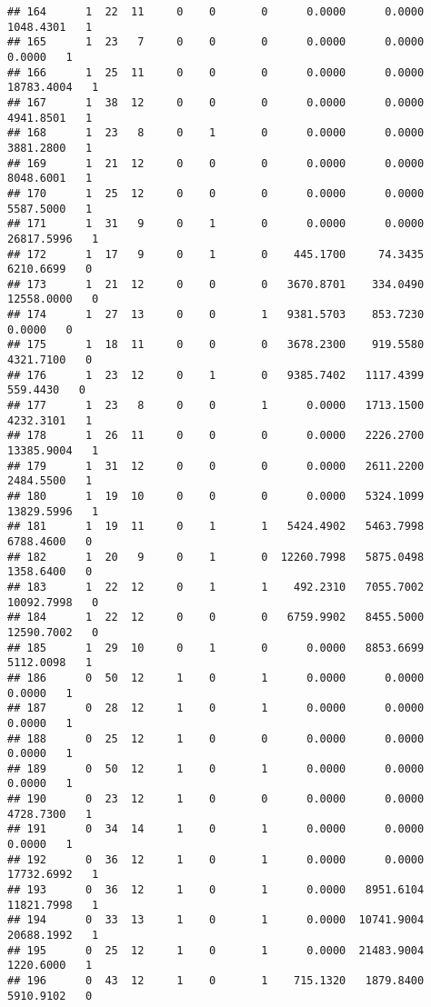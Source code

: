 \documentclass[
]{article}
\begin{document}
\begin{enumerate}
\begin{verbatim}
## 164      1  22  11     0    0       0      0.0000      0.0000   1048.4301   1
## 165      1  23   7     0    0       0      0.0000      0.0000      0.0000   1
## 166      1  25  11     0    0       0      0.0000      0.0000  18783.4004   1
## 167      1  38  12     0    0       0      0.0000      0.0000   4941.8501   1
## 168      1  23   8     0    1       0      0.0000      0.0000   3881.2800   1
## 169      1  21  12     0    0       0      0.0000      0.0000   8048.6001   1
## 170      1  25  12     0    0       0      0.0000      0.0000   5587.5000   1
## 171      1  31   9     0    1       0      0.0000      0.0000  26817.5996   1
## 172      1  17   9     0    1       0    445.1700     74.3435   6210.6699   0
## 173      1  21  12     0    0       0   3670.8701    334.0490  12558.0000   0
## 174      1  27  13     0    0       1   9381.5703    853.7230      0.0000   0
## 175      1  18  11     0    0       0   3678.2300    919.5580   4321.7100   0
## 176      1  23  12     0    1       0   9385.7402   1117.4399    559.4430   0
## 177      1  23   8     0    0       1      0.0000   1713.1500   4232.3101   1
## 178      1  26  11     0    0       0      0.0000   2226.2700  13385.9004   1
## 179      1  31  12     0    0       0      0.0000   2611.2200   2484.5500   1
## 180      1  19  10     0    0       0      0.0000   5324.1099  13829.5996   1
## 181      1  19  11     0    1       1   5424.4902   5463.7998   6788.4600   0
## 182      1  20   9     0    1       0  12260.7998   5875.0498   1358.6400   0
## 183      1  22  12     0    1       1    492.2310   7055.7002  10092.7998   0
## 184      1  22  12     0    0       0   6759.9902   8455.5000  12590.7002   0
## 185      1  29  10     0    1       0      0.0000   8853.6699   5112.0098   1
## 186      0  50  12     1    0       1      0.0000      0.0000      0.0000   1
## 187      0  28  12     1    0       1      0.0000      0.0000      0.0000   1
## 188      0  25  12     1    0       0      0.0000      0.0000      0.0000   1
## 189      0  50  12     1    0       1      0.0000      0.0000      0.0000   1
## 190      0  23  12     1    0       0      0.0000      0.0000   4728.7300   1
## 191      0  34  14     1    0       1      0.0000      0.0000      0.0000   1
## 192      0  36  12     1    0       1      0.0000      0.0000  17732.6992   1
## 193      0  36  12     1    0       1      0.0000   8951.6104  11821.7998   1
## 194      0  33  13     1    0       1      0.0000  10741.9004  20688.1992   1
## 195      0  25  12     1    0       1      0.0000  21483.9004   1220.6000   1
## 196      0  43  12     1    0       1    715.1320   1879.8400   5910.9102   0

\end{verbatim}
\end{enumerate}
\end{document}
